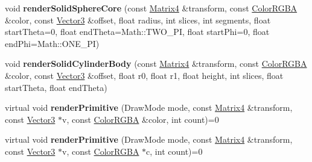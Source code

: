 \begin{DoxyCompactItemize}
\item 
void {\bfseries render\+Solid\+Sphere\+Core} (const \hyperlink{class_i_dream_sky_1_1_matrix4}{Matrix4} \&transform, const \hyperlink{class_i_dream_sky_1_1_color_r_g_b_a}{Color\+R\+G\+BA} \&color, const \hyperlink{class_i_dream_sky_1_1_vector3}{Vector3} \&offset, float radius, int slices, int segments, float start\+Theta=0, float end\+Theta=Math\+::\+T\+W\+O\+\_\+\+PI, float start\+Phi=0, float end\+Phi=Math\+::\+O\+N\+E\+\_\+\+PI)\hypertarget{class_i_dream_sky_1_1_i_component_debug_renderer_a4eb339c3ed885ef40d61129347dd30ab}{}\label{class_i_dream_sky_1_1_i_component_debug_renderer_a4eb339c3ed885ef40d61129347dd30ab}

\item 
void {\bfseries render\+Solid\+Cylinder\+Body} (const \hyperlink{class_i_dream_sky_1_1_matrix4}{Matrix4} \&transform, const \hyperlink{class_i_dream_sky_1_1_color_r_g_b_a}{Color\+R\+G\+BA} \&color, const \hyperlink{class_i_dream_sky_1_1_vector3}{Vector3} \&offset, float r0, float r1, float height, int slices, float start\+Theta, float end\+Theta)\hypertarget{class_i_dream_sky_1_1_i_component_debug_renderer_abd7539bede12d4e28e309233bc70588f}{}\label{class_i_dream_sky_1_1_i_component_debug_renderer_abd7539bede12d4e28e309233bc70588f}

\item 
virtual void {\bfseries render\+Primitive} (Draw\+Mode mode, const \hyperlink{class_i_dream_sky_1_1_matrix4}{Matrix4} \&transform, const \hyperlink{class_i_dream_sky_1_1_vector3}{Vector3} $\ast$v, const \hyperlink{class_i_dream_sky_1_1_color_r_g_b_a}{Color\+R\+G\+BA} \&color, int count)=0\hypertarget{class_i_dream_sky_1_1_i_component_debug_renderer_af400d2e5d302a794f0f30e19f064e0c0}{}\label{class_i_dream_sky_1_1_i_component_debug_renderer_af400d2e5d302a794f0f30e19f064e0c0}

\item 
virtual void {\bfseries render\+Primitive} (Draw\+Mode mode, const \hyperlink{class_i_dream_sky_1_1_matrix4}{Matrix4} \&transform, const \hyperlink{class_i_dream_sky_1_1_vector3}{Vector3} $\ast$v, const \hyperlink{class_i_dream_sky_1_1_color_r_g_b_a}{Color\+R\+G\+BA} $\ast$c, int count)=0\hypertarget{class_i_dream_sky_1_1_i_component_debug_renderer_ac3e7beffc1505ca73830073fa5a1d0a4}{}\label{class_i_dream_sky_1_1_i_component_debug_renderer_ac3e7beffc1505ca73830073fa5a1d0a4}

\end{DoxyCompactItemize}
